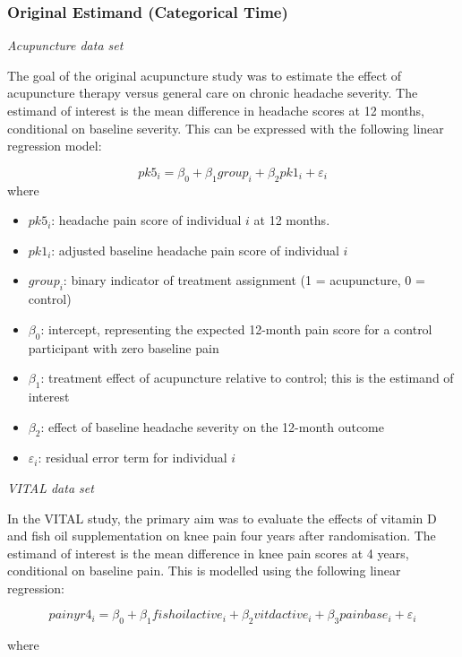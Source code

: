 \documentclass{article}
\providecommand{\tightlist}{%
  \setlength{\itemsep}{0pt}\setlength{\parskip}{0pt}}
\begin{document}
\subsubsection{Original Estimand (Categorical
Time)}\label{original-estimand-categorical-time}

\emph{Acupuncture data set}

The goal of the original acupuncture study was to estimate the effect of
acupuncture therapy versus general care on chronic headache severity.
The estimand of interest is the mean difference in headache scores at 12
months, conditional on baseline severity. This can be expressed with the
following linear regression model:

\[pk5_i = \beta_0 + \beta_1 group_i + \beta_2 pk1_i + \varepsilon_i\]
where

\begin{itemize}
\tightlist
\item
  \(pk5_i\): headache pain score of individual \(i\) at 12 months.
\item
  \(pk1_i\): adjusted baseline headache pain score of individual \(i\)
\item
  \(group_i\): binary indicator of treatment assignment (1 =
  acupuncture, 0 = control)
\item
  \(\beta_0\): intercept, representing the expected 12-month pain score
  for a control participant with zero baseline pain
\item
  \(\beta_1\): treatment effect of acupuncture relative to control; this
  is the estimand of interest
\item
  \(\beta_2\): effect of baseline headache severity on the 12-month
  outcome
\item
  \(\varepsilon_i\): residual error term for individual \(i\)
\end{itemize}

\emph{VITAL data set}

In the VITAL study, the primary aim was to evaluate the effects of
vitamin D and fish oil supplementation on knee pain four years after
randomisation. The estimand of interest is the mean difference in knee
pain scores at 4 years, conditional on baseline pain. This is modelled
using the following linear regression:

\[painyr4_i = \beta_0 + \beta_1 fishoilactive_i + \beta_2 vitdactive_i + \beta_3 painbase_i + \varepsilon_i\]

where
\end{document}
